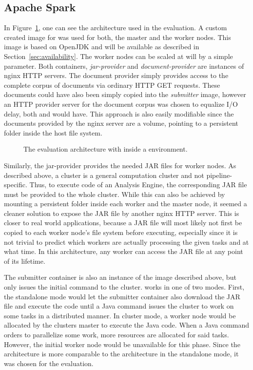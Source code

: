 \subsection{Apache Spark}
\label{ssec:spark}
In Figure~\ref{fig:arch-spark}, one can see the \docker{} architecture used in the evaluation. A custom created image for \spark{} was used for both, the master and the worker nodes. This image is based on OpenJDK and will be available as described in Section~\ref{sec:availability}. The \spark{} worker nodes can be scaled at will by a simple \docker{} parameter. Both containers, \emph{jar-provider} and \emph{document-provider} are  instances of nginx HTTP servers. The document provider simply provides access to the complete corpus of documents via ordinary HTTP GET requests. These documents could have also been simply copied into the \emph{submitter} image, however an HTTP provider server for the document corpus was chosen to equalize I/O delay, both \uimaas{} and \spark{} would have. This approach is also easily modifiable since the documents provided by the nginx server are a volume, pointing to a persistent folder inside the host file system.
\begin{figure}[tbh]
	\centering
	
	\caption[The evaluation architecture with Spark inside a Docker environment.]{The evaluation architecture with \spark{} inside a \docker{} environment.}
	\label{fig:arch-spark}
\end{figure}
Similarly, the jar-provider provides the needed JAR files for \spark{} worker nodes. As described above, a \spark{} cluster is a general computation cluster and not pipeline-specific. Thus, to execute code of an Analysis Engine, the corresponding JAR file must be provided to the whole cluster. While this can also be achieved by mounting a persistent folder inside each worker and the master node, it seemed a cleaner solution to expose the JAR file by another nginx HTTP server. This is closer to real world applications, because a JAR file will most likely not first be copied to each worker node's file system before executing, especially since it is not trivial to predict which workers are actually processing the given tasks and at what time. In this architecture, any worker can access the JAR file at any point of its lifetime.

The submitter container is also an instance of the \spark{} image described above, but only issues the initial command to the cluster. \spark{} works in one of two modes. First, the standalone mode would let the submitter container also download the JAR file and execute the code until a Java command issues the cluster to work on some tasks in a distributed manner. In cluster mode, a worker node would be allocated by the clusters master to execute the Java code. When a Java command orders \spark{} to parallelize some work, more resources are allocated for said tasks. However, the initial worker node would be unavailable for this phase. Since the architecture is more comparable to the \uimaas{} architecture in the standalone mode, it was chosen for the evaluation.
